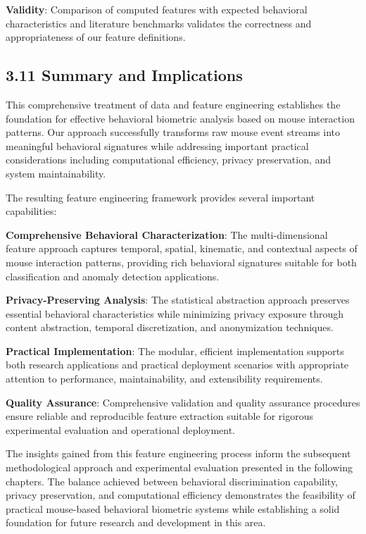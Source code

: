 \documentclass[
  11pt,
  a4paper,
]{article}
\begin{document}
\textbf{Validity}: Comparison of computed features with expected
behavioral characteristics and literature benchmarks validates the
correctness and appropriateness of our feature definitions.

\subsection{3.11 Summary and
Implications}\label{summary-and-implications}

This comprehensive treatment of data and feature engineering establishes
the foundation for effective behavioral biometric analysis based on
mouse interaction patterns. Our approach successfully transforms raw
mouse event streams into meaningful behavioral signatures while
addressing important practical considerations including computational
efficiency, privacy preservation, and system maintainability.

The resulting feature engineering framework provides several important
capabilities:

\textbf{Comprehensive Behavioral Characterization}: The
multi-dimensional feature approach captures temporal, spatial,
kinematic, and contextual aspects of mouse interaction patterns,
providing rich behavioral signatures suitable for both classification
and anomaly detection applications.

\textbf{Privacy-Preserving Analysis}: The statistical abstraction
approach preserves essential behavioral characteristics while minimizing
privacy exposure through content abstraction, temporal discretization,
and anonymization techniques.

\textbf{Practical Implementation}: The modular, efficient implementation
supports both research applications and practical deployment scenarios
with appropriate attention to performance, maintainability, and
extensibility requirements.

\textbf{Quality Assurance}: Comprehensive validation and quality
assurance procedures ensure reliable and reproducible feature extraction
suitable for rigorous experimental evaluation and operational
deployment.

The insights gained from this feature engineering process inform the
subsequent methodological approach and experimental evaluation presented
in the following chapters. The balance achieved between behavioral
discrimination capability, privacy preservation, and computational
efficiency demonstrates the feasibility of practical mouse-based
behavioral biometric systems while establishing a solid foundation for
future research and development in this area.
\end{document}
